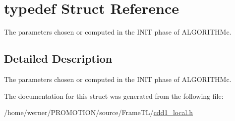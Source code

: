 \hypertarget{structtypedef}{
\section{typedef Struct Reference}
\label{structtypedef}
}
The parameters chosen or computed in the INIT phase of ALGORITHMc.  




\subsection{Detailed Description}
The parameters chosen or computed in the INIT phase of ALGORITHMc. 

The documentation for this struct was generated from the following file:\begin{CompactItemize}
\item 
/home/werner/PROMOTION/source/FrameTL/\hyperlink{cdd1__local_8h}{cdd1\_\-local.h}\end{CompactItemize}
